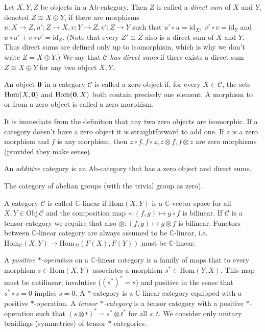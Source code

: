 \documentclass[12pt]{article}
\theoremstyle{definition}
\theoremstyle{definition}
\theoremstyle{remark}
\newcommand{\Obj}{\mathrm{Obj}}
\def\2#1{{\mathcal #1}}
\def\7#1{{\mathbb #1}}
\def\1#1{{\bf #1}}
\newcommand{\Hom}{\mathrm{Hom}}
\newcommand{\rarr}{\rightarrow}
\def\id{\mathrm{id}}
\begin{document}
\bdefin \label{def-dirsum}
Let $X,Y,Z$ be objects in a Ab-category. Then $Z$ is called a \emph{direct sum} of $X$ and $Y$,
denoted $Z\cong X\oplus Y$, if there are morphisms $u:X\rarr Z, u':Z\rarr X,v:Y\rarr Z, v':Z\rarr Y$
such that $u'\circ u=\id_X,\ v'\circ v=\id_Y$ and $u\circ u'+v\circ v'=\id_Z$. (Note that every
$Z'\cong Z$ also is a direct sum of $X$ and $Y$. Thus direct sums are defined only up to
isomorphism, which is why we don't write $Z=X\oplus Y$.) We say  that $\2C$ \emph{has direct sums}
if there exists a direct sum $Z\cong X\oplus Y$ for any two object $X,Y$.
\edefin

\bdefin
An object $\10$ in a category $\2C$ is called a zero object if, for every $X\in\2C$, the sets
$\Hom(X,\10)$ and $\Hom(\10,X)$ both contain precisely one element. A morphism to or from a zero
object is called a zero morphism. 
\edefin

It is immediate from the definition that any two zero objects are isomorphic. If a category doesn't
have a zero object it is straightforward to add one. If $z$ is a zero morphism and $f$ is any
morphism, then $z\circ f, f\circ z, z\otimes f, f\otimes z$ are zero morphisms (provided they make sense).


\bdefin {}  
An \emph{additive} category is an Ab-category that has a zero object and direct sums.
\edefin

\bexam The category of abelian groups (with the trivial group as zero).
\eexam

\bdefin \index{category!$\7C$-linear}
A category $\2C$ is called $\7C$-linear if $\Hom(X,Y)$ is a $\7C$-vector space for all
$X,Y\in\Obj\,\2C$ and the composition map $\circ: (f,g)\mapsto g\circ f$ is bilinear. If $\2C$ is a
tensor category we require that also $\otimes: (f,g)\mapsto g\otimes f$ is bilinear.
Functors between $\7C$-linear category are always assumed to be $\7C$-linear, i.e.\
$\Hom_\2C(X,Y)\rarr\Hom_\2D(F(X),F(Y))$ must be $\7C$-linear.
\edefin


\bdefin {}
A \emph{positive $*$-operation} on a $\7C$-linear category is a family of maps that to every
morphism $s\in\Hom(X,Y)$ associates a morphism $s^*\in\Hom(Y,X)$. This map must be antilinear,
involutive ($(s^*)^*=s$) and positive in the sense that $s^*\circ s=0$ implies $s=0$. A $*$-category
is a $\7C$-linear category equipped with a positive $*$-operation. A \emph{tensor $*$-category} is a tensor
category with a positive $*$-operation such that $(s\otimes t)^*=s^*\otimes t^*$ for all $s,t$.
We consider only unitary braidings (symmetries) of tensor $*$-categories.
\edefin
\end{document}
